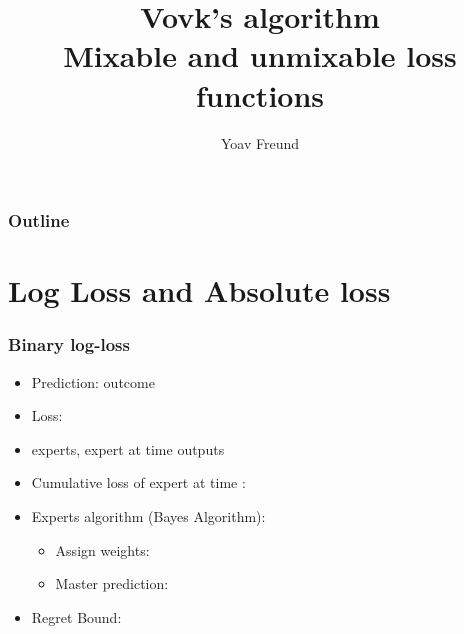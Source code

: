 \documentclass[handout]{beamer}
\title [Vovk's algorithm] %
{Vovk's algorithm \\ Mixable and unmixable loss functions}
\author[Freund] %
{Yoav Freund}
\institute[Universities of Somewhere and Elsewhere] %
\begin{document}
%

\begin{frame}
  \titlepage
\end{frame}

\begin{frame}
  \frametitle{Outline}
  \tableofcontents[pausesections]
\end{frame}

\section{Log Loss and Absolute loss}

\begin{frame}
\frametitle{Binary log-loss}
\begin{itemize}
\item Prediction:  outcome 
\item Loss: 
\item {} experts, expert  at time  outputs 
\item Cumulative loss of expert  at time : 
\item Experts algorithm (Bayes Algorithm):
  \begin{itemize}
    \item Assign weights: 
    \item Master prediction:
  \end{itemize}
\item Regret Bound:
\end{itemize}
\end{frame}
\end{document}
